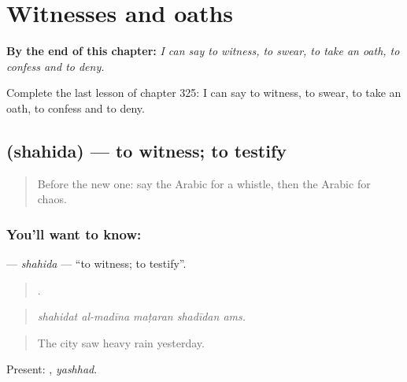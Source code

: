 
\chapter{Witnesses and oaths}
\label{ch:ar-witnesses-and-oaths}

\begin{chapteropening}
\textbf{By the end of this chapter:} \emph{I can say to witness, to swear, to take an oath, to confess and to deny.}

Complete the last lesson of chapter 325: I can say to witness, to swear, to take an oath, to confess and to deny.
\end{chapteropening}

\section[\texorpdfstring{\ar{شهد} (shahida)}{شهد (shahida)}]{ (shahida) — to witness; to testify}

\label{lesson:AR-C325-shahida}



\begin{quote}
Before the new one: say the Arabic for a whistle, then the Arabic for chaos.
\end{quote}

\subsection*{You'll want to know: }
\textbf{} — \emph{shahida} — \textquotedblleft{}to witness; to testify\textquotedblright{}.

\begin{quote}
    .
\end{quote}

\begin{quote}
\emph{shahidat al-madīna maṭaran shadīdan ams.}
\end{quote}

\begin{quote}
The city saw heavy rain yesterday.
\end{quote}

Present: , \emph{yashhad}.

